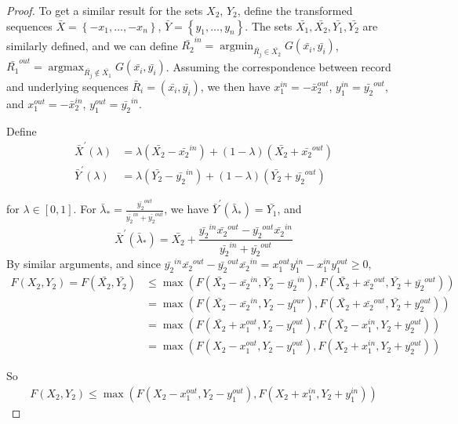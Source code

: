 \documentclass{article}
\theoremstyle{case}
\DeclareMathOperator*{\argmax}{argmax} %
\DeclareMathOperator*{\argmin}{argmin} %
\begin{document}
\begin{proof}
To get a similar result for the sets $X_2$, $Y_2$, define the transformed sequences $\bar{X} = \left\lbrace -x_1, \dots, -x_n\right\rbrace$, $\bar{Y} = \left\lbrace y_1, \dots, y_n\right\rbrace$. The sets $\bar{X_1}, \bar{X_2}, \bar{Y_1}, \bar{Y_2}$ are similarly defined, and we can define $\bar{R_2}^{in} = \argmin_{\bar{R_j} \in \bar{X_2}} G(\bar{x_i}, \bar{y_i})$, $\bar{R_1}^{out} = \argmax_{\bar{R_j} \not\in \bar{X_1}} G(\bar{x_i}, \bar{y_i})$. Assuming the correspondence between record and underlying sequences $\bar{R}_i = \left(\bar{x_i}, \bar{y_i}\right)$, we then have $x_1^{in} = -\bar{x}_2^{out}$, $y_1^{in} = \bar{y_2}^{out}$, and $x_1^{out} = -\bar{x}_2^{in}$, $y_1^{out} = \bar{y_2}^{in}$. 

Define
\begin{align*}
\bar{X}^\prime\left( \lambda \right) & = \lambda \left( \bar{X_2} - \bar{x_2}^{in}\right) + \left( 1 - \lambda\right) \left( \bar{X_2} + \bar{x_2}^{out}\right) \\
\bar{Y}^\prime\left( \lambda \right) & = \lambda \left( \bar{Y_2} - \bar{y_2}^{in}\right) + \left( 1 - \lambda\right) \left( \bar{Y_2} + \bar{y_2}^{out}\right)
\end{align*}

for $\lambda \in \left[ 0,1\right]$. For $\bar{\lambda}_{*} = \frac{\bar{y_2}^{out}}{\bar{y_2}^{in} + \bar{y_2}^{out}}$, we have $\bar{Y}^\prime\left( \bar{\lambda}_{*}\right) = \bar{Y_1}$, and 
\[\bar{X}^\prime\left( \bar{\lambda}_{*}\right) = \bar{X_2} + \frac{\bar{y_2}^{in}\bar{x_2}^{out}-\bar{y_2}^{out}\bar{x_2}^{in}}{\bar{y_2}^{in} + \bar{y_2}^{out}}\]
By similar arguments, and since $\bar{y_2}^{in}\bar{x_2}^{out}-\bar{y_2}^{out}\bar{x_2}^{in} = x_1^{out}y_1^{in} - x_1^{in}y_1^{out} \geq 0$, 
\begin{align*}
F(X_2, Y_2) = F(\bar{X_2}, \bar{Y_2}) & \leq \max{\left(F(\bar{X_2}-\bar{x_2}^{in},\bar{Y_2}-\bar{y_2}^{in}), F(\bar{X_2}+\bar{x_2}^{out},\bar{Y_2}+\bar{y_2}^{out})\right)} \\
& = \max{\left(F(\bar{X_2}-\bar{x_2}^{in},Y_2-y_1^{our}), F(\bar{X_2}+\bar{x_2}^{out},\bar{Y_2}+y_2^{out})\right)} \\
& = \max{\left(F(\bar{X_2} +x_1^{out},Y_2-y_1^{out}), F(\bar{X_2}-x_1^{in},Y_2+y_2^{out})\right)} \\
& = \max{\left(F(X_2 -x_1^{out},Y_2-y_1^{out}), F(X_2+x_1^{in},Y_2+y_2^{out})\right)}
\end{align*}

So
\begin{align} \label{eq4}
F(X_2, Y_2) \leq \max{\left(F(X_2-x_1^{out},Y_2-y_1^{out}), F(X_2+x_1^{in},Y_2+y_1^{in})\right)}
\end{align}


\end{proof}
\end{document}
